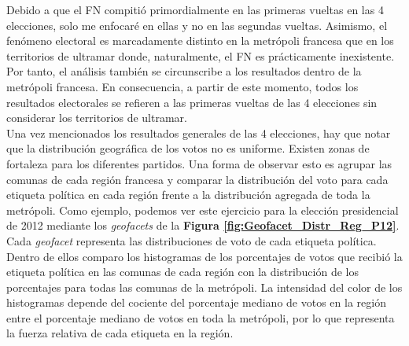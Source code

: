 Debido a que el FN compitió primordialmente en las primeras vueltas en las 4 elecciones, solo me enfocaré en ellas y no en las segundas vueltas. Asimismo, el fenómeno electoral es marcadamente distinto en la metrópoli francesa que en los territorios de ultramar donde, naturalmente, el FN es prácticamente inexistente. Por tanto, el análisis también se circunscribe a los resultados dentro de la metrópoli francesa. En consecuencia, a partir de este momento, todos los resultados electorales se refieren a las primeras vueltas de las 4 elecciones sin considerar los territorios de ultramar.\\

Una vez mencionados los resultados generales de las 4 elecciones, hay que notar que la distribución geográfica de los votos no es uniforme. Existen zonas de fortaleza para los diferentes partidos. Una forma de observar esto es agrupar las comunas de cada región francesa y comparar la distribución del voto para cada etiqueta política en cada región frente a la distribución agregada de toda la metrópoli. Como ejemplo, podemos ver este ejercicio para la elección presidencial de 2012 mediante los \textit{geofacets} de la \textbf{Figura \ref{fig:Geofacet_Distr_Reg_P12}}. Cada \textit{geofacet} representa las distribuciones de voto de cada etiqueta política. Dentro de ellos comparo los histogramas de los porcentajes de votos que recibió la etiqueta política en las comunas de cada región con la distribución de los porcentajes para todas las comunas de la metrópoli. La intensidad del color de los histogramas depende del cociente del porcentaje mediano de votos en la región entre el porcentaje mediano de votos en toda la metrópoli, por lo que representa la fuerza relativa de cada etiqueta en la región.\\

